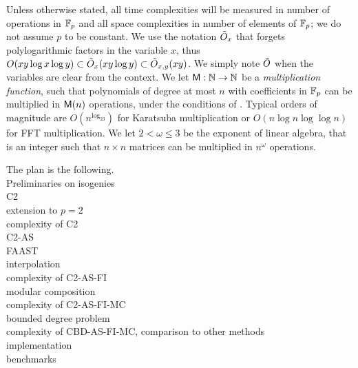 Unless otherwise stated, all time complexities will be measured in
number of operations in $\mathbb{F}_p$ and all space complexities in number of
elements of $\mathbb{F}_p$; we do not assume $p$ to be constant. We use the
notation $\tilde{O}_x$ that forgets polylogarithmic factors in the
variable $x$, thus $O(xy\log x \log y)\subset\tilde{O}_x(xy\log
y)\subset\tilde{O}_{x,y}(xy)$. We simply note $\tilde{O}$ when the variables
are clear from the context. We let $\mathrm{\sf M}:\mathbb{N}\rightarrow\mathbb{N}$ be a
\emph{multiplication function}, such that polynomials of degree at
most $n$ with coefficients in $\mathbb{F}_p$ can be multiplied in $\mathrm{\sf M}(n)$
operations, under the conditions of \cite[Ch. 8.3]{vzGG}. Typical
orders of magnitude are $O(n^{\log_23})$ for Karatsuba multiplication
or $O(n\log n\log\log n)$ for FFT multiplication. We let
$2<\omega\le3$ be the exponent of linear algebra, that is an integer
such that $n\times n$ matrices can be multiplied in $n^\omega$
operations.

The plan is the following.\\
Preliminaries on isogenies\\
C2\\
extension to $p=2$\\
complexity of C2\\
C2-AS\\
FAAST\\
interpolation\\
complexity of C2-AS-FI\\
modular composition\\
complexity of C2-AS-FI-MC\\
bounded degree problem\\
complexity of CBD-AS-FI-MC, comparison to other methods\\
implementation\\
benchmarks\\



%
